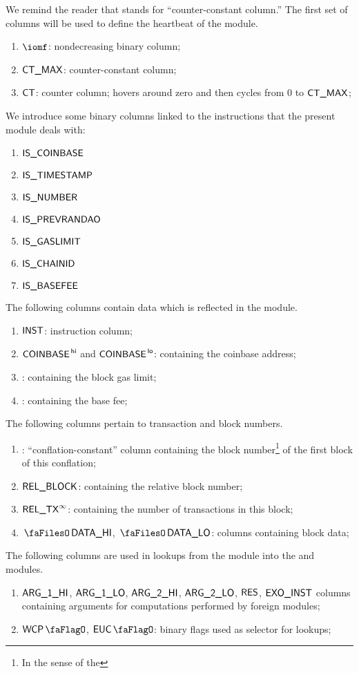 We remind the reader that \ccc{} stands for ``counter-constant column.''
The first set of columns will be used to define the heartbeat of the \btcMod{} module.
\begin{enumerate}
	\item $\iomf$:
		nondecreasing binary column;
	\item $\textsf{CT\_MAX}$:
		counter-constant column;
	\item $\textsf{CT}$:
		counter column; hovers around zero and then cycles from $0$ to $\textsf{CT\_MAX}$;
\end{enumerate}
We introduce some binary columns linked to the instructions that the present module deals with:
\begin{multicols}{3}
	\begin{enumerate}[resume]
		\item $\textsf{IS\_COINBASE}$
		\item $\textsf{IS\_TIMESTAMP}$
		\item $\textsf{IS\_NUMBER}$
		\item $\textsf{IS\_PREVRANDAO}$
		\item $\textsf{IS\_GASLIMIT}$
		\item $\textsf{IS\_CHAINID}$
		\item $\textsf{IS\_BASEFEE}$
	\end{enumerate}
\end{multicols}
\noindent The following columns contain data which is reflected in the \txnDataMod{} module.
\begin{enumerate}[resume, start=13]
	\item $\textsf{INST}$:
		instruction column;
	\item $\textsf{COINBASE}^{\mathsf{\,hi}}$ and $\textsf{COINBASE}^{\mathsf{\,lo}}$:
		\ccc{} containing the
		coinbase address;
	\item \blockGasLimit{}:
		\ccc{} containing the
		block gas limit;
	\item \basefee{}:
		\ccc{} containing the
		base fee;
\end{enumerate}
The following columns pertain to transaction and block numbers.
\begin{enumerate}[resume]
	\item \blockNumberOfFirstBlockInConflation{}:
		``conflation-constant'' column containing the block number\footnote{In the sense of the \evm{}} of the first block of this conflation;
	\item $\textsf{REL\_BLOCK}$:
		\ccc{} containing the relative block number;
	\item $\textsf{REL\_TX}^\infty$:
		\ccc{} containing the number of transactions in this block;
	\item $\blockDataHi$, $\blockDataLo$:
		columns containing block data;
\end{enumerate}
The following columns are used in lookups from the \btcMod{} module into the \wcpMod{} and \eucMod{} modules.
\begin{enumerate}[resume]
	\item $\textsf{ARG}\textsf{\_1}\textsf{\_HI}$, $\textsf{ARG}\textsf{\_1}\textsf{\_LO}$, $\textsf{ARG}\textsf{\_2}\textsf{\_HI}$, $\textsf{ARG}\textsf{\_2}\textsf{\_LO}$, $\textsf{RES}$, $\textsf{EXO\_}\textsf{INST}$
		columns containing arguments for computations performed by foreign modules;
	\item $\wcpFlag$, $\eucFlag$:
		binary flags used as selector for lookups;
\end{enumerate}
